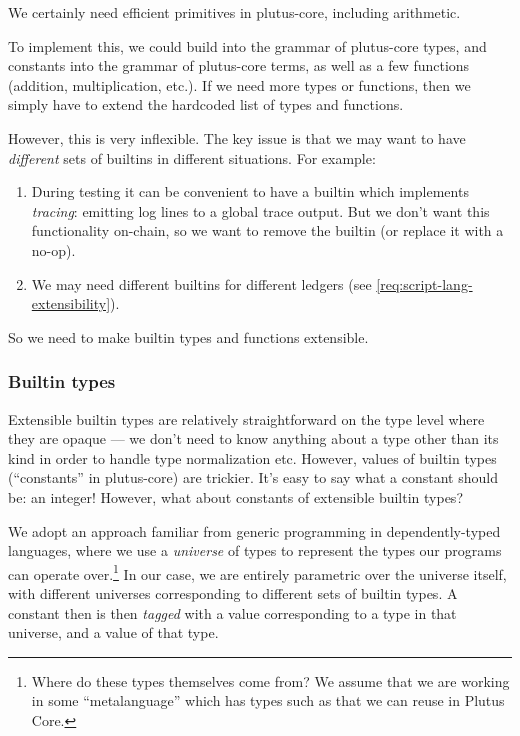 We certainly need efficient primitives in \gls{plutus-core}, including arithmetic.

To implement this, we could build  into the grammar of \gls{plutus-core} types, and  constants into the grammar of \gls{plutus-core} terms, as well as a few functions (addition, multiplication, etc.).
If we need more types or functions, then we simply have to extend the hardcoded list of types and functions.

However, this is very inflexible.
The key issue is that we may want to have \emph{different} sets of builtins in different situations.
For example:
\begin{enumerate}
\item
  During testing it can be convenient to have a builtin which implements \emph{tracing}: emitting log lines to a global trace output.
  But we don't want this functionality on-chain, so we want to remove the builtin (or replace it with a no-op).
\item
  We may need different builtins for different ledgers (see \cref{req:script-lang-extensibility}).
\end{enumerate}

So we need to make builtin types and functions extensible.

\subsubsection{Builtin types}

Extensible builtin types are relatively straightforward on the type level where they are opaque --- we don't need to know anything about a type other than its kind in order to handle type normalization etc.
However, values of builtin types (``constants'' in \gls{plutus-core}) are trickier.
It's easy to say what a  constant should be: an integer!
However, what about constants of extensible builtin types?

We adopt an approach familiar from generic programming in dependently-typed languages, where we use a \emph{universe} of types to represent the types our programs can operate over.\footnote{
  Where do these types themselves come from?
  We assume that we are working in some ``metalanguage'' which has types such as  that we can reuse in Plutus Core.
}
In our case, we are entirely parametric over the universe itself, with different universes corresponding to different sets of builtin types.
A constant then is then \emph{tagged} with a value corresponding to a type in that universe, and a value of that type.


